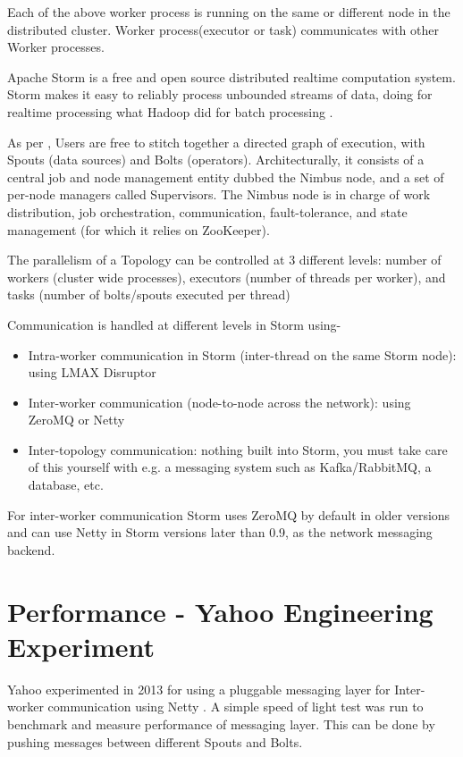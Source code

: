 \documentclass[9pt,twocolumn,twoside]{../../styles/osajnl}
\begin{document}
Each of the above worker process is running on the same or different
node in the distributed cluster. Worker process(executor or task)
communicates with other Worker processes.

Apache Storm is a free and open source distributed realtime
computation system. Storm makes it easy to reliably process unbounded
streams of data, doing for realtime processing what Hadoop did for
batch processing \cite{www-storm}.

As per \cite{article-nabi2014streams}, Users are free to stitch
together a directed graph of execution, with Spouts (data sources) and
Bolts (operators). Architecturally, it consists of a central job and
node management entity dubbed the Nimbus node, and a set of per-node
managers called Supervisors. The Nimbus node is in charge of work
distribution, job orchestration, communication, fault-tolerance, and
state management (for which it relies on ZooKeeper).

The parallelism of a Topology can be controlled at 3 different levels:
number of workers (cluster wide processes), executors (number of
threads per worker), and tasks (number of bolts/spouts executed per
thread)

Communication is handled at different levels in Storm using-
\begin{itemize}
  \renewcommand{\labelitemi}{\scriptsize$\square$}
        \item Intra-worker communication in Storm (inter-thread on the
          same Storm node): using LMAX Disruptor
        \item Inter-worker communication (node-to-node across
          the network): using ZeroMQ or Netty
        \item Inter-topology communication: nothing
built into Storm, you must take care of this yourself with e.g. a
messaging system such as Kafka/RabbitMQ, a database, etc.
\end{itemize}

For inter-worker communication Storm uses ZeroMQ by default in older
versions and can use Netty in Storm versions later than 0.9, as the
network messaging backend.

\section{Performance - Yahoo Engineering Experiment}

Yahoo experimented in 2013 for using a pluggable messaging layer for
Inter-worker communication using Netty \cite{article-storm-netty}. A
simple speed of light test was run to benchmark and measure
performance of messaging layer. This can be done by pushing messages
between different Spouts and Bolts.
\end{document}
